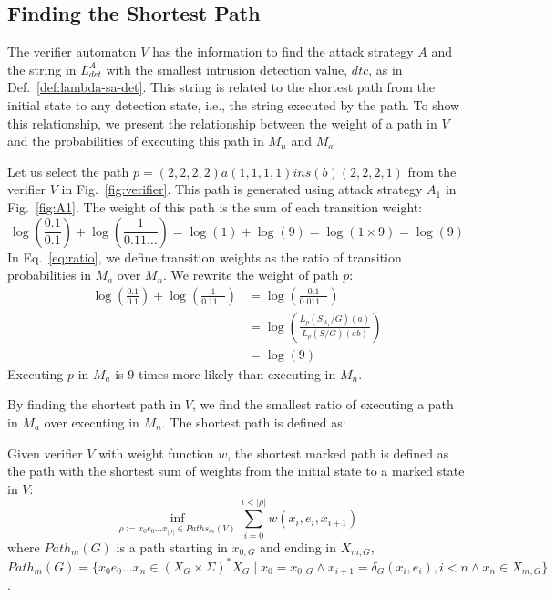 \subsection{Finding the Shortest Path}
The verifier automaton $V$ has the information to find the attack strategy $A$ and the string in $L^A_{det}$ with the smallest intrusion detection value, $dtc$, as in Def.~\ref{def:lambda-sa-det}.
This string is related to the shortest path from the initial state to any detection state, i.e., the string executed by the path.
To show this relationship, we present the relationship between the weight of a path in $V$ and the probabilities of executing this path in $M_n$ and $M_a$

Let us select the path $p = (2,2,2,2)a(1,1,1,1)ins(b)\allowbreak(2,2,2,1)$ from the verifier $V$ in Fig.~\ref{fig:verifier}.
This path is generated using attack strategy $A_1$ in Fig.~\ref{fig:A1}.
The weight of this path is the sum of each transition weight: $$\log(\frac{0.1}{0.1})+\log(\frac{1}{0.11\dots})=\log(1)+\log(9) = \log(1\times 9) = \log(9)$$
In Eq.~\ref{eq:ratio}, we define transition weights as the ratio of transition probabilities in $M_a$ over  $M_n$.
We rewrite the weight of path $p$:
\begin{align*}
\log(\frac{0.1}{0.1})+\log(\frac{1}{0.11\dots}) &= \log(\frac{0.1}{0.011\dots})\\&=\log(\frac{L_p(S_{A_1}/G)(a)}{L_p(S/G)(ab)})\\& =\log(9)
\end{align*}
Executing $p$ in $M_a$ is $9$ times more likely than executing in $M_n$.

By finding the shortest path in $V$, we find the smallest ratio of executing a path in $M_a$ over executing in $M_n$.
The shortest path is defined as:
\begin{definition}\label{def:shortest-path}
Given verifier $V$ with weight function $w$, the shortest marked path is defined as the path with the shortest sum of weights from the initial state to a marked state in $V$:
$$\inf_{\rho:=x_0e_0\dots x_{|\rho|}\in Paths_m(V)}\sum_{i=0}^{i<|\rho|}w(x_i,e_i,x_{i+1})$$
where $Path_m(G)$ is a path starting in $x_{0,G}$ and ending in $X_{m,G}$, $Path_m(G) = \{x_0e_0\dots x_n\in (X_G\times \Sigma)^*X_G \mid  x_0 = x_{0,G}\wedge x_{i+1} = \delta_G(x_i,e_i), i<n \wedge x_n\in X_{m,G}\}$.
\end{definition}

